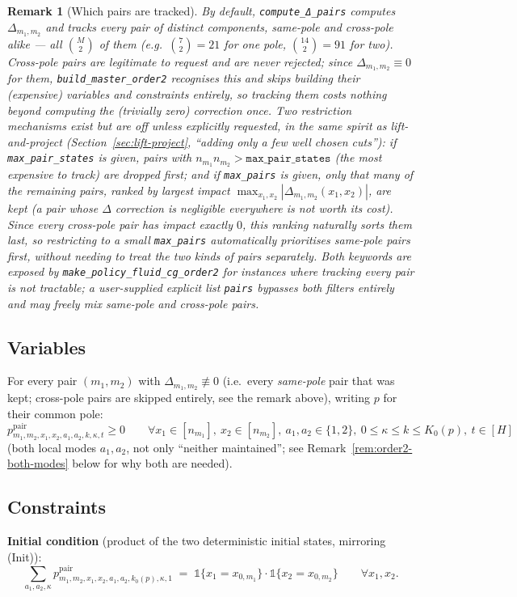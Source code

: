 \documentclass[11pt]{article}
\newtheorem{remark}{Remark}
\begin{document}
\begin{remark}[Which pairs are tracked]
By default, \texttt{compute\_Δ\_pairs} computes $\Delta_{m_1,m_2}$ and tracks \emph{every}
pair of distinct components, same-pole \emph{and} cross-pole alike --- all
$\binom{M}{2}$ of them (e.g.\ $\binom{7}{2}=21$ for one pole, $\binom{14}{2}=91$ for two).
Cross-pole pairs are legitimate to request and are never rejected; since
$\Delta_{m_1,m_2} \equiv 0$ for them, \texttt{build\_master\_order2} recognises this and
skips building their (expensive) variables and constraints entirely, so tracking them
costs nothing beyond computing the (trivially zero) correction once. Two restriction
mechanisms exist but are \emph{off} unless explicitly requested, in the same spirit as
lift-and-project (Section~\ref{sec:lift-project}, ``adding only a few well chosen cuts''):
if \texttt{max\_pair\_states} is given, pairs with $n_{m_1} n_{m_2} >
\texttt{max\_pair\_states}$ (the most expensive to track) are dropped first; and if
\texttt{max\_pairs} is given, only that many of the remaining pairs, ranked by largest
impact $\max_{x_1,x_2} |\Delta_{m_1,m_2}(x_1,x_2)|$, are kept (a pair whose
$\Delta$ correction is negligible everywhere is not worth its cost). Since every
cross-pole pair has impact exactly $0$, this ranking naturally sorts them last, so
restricting to a small \texttt{max\_pairs} automatically prioritises same-pole pairs
first, without needing to treat the two kinds of pairs separately. Both keywords are
exposed by \texttt{make\_policy\_fluid\_cg\_order2} for instances where tracking every
pair is not tractable; a user-supplied explicit list \texttt{pairs} bypasses both filters
entirely and may freely mix same-pole and cross-pole pairs.
\end{remark}

\subsection*{Variables}
For every pair $(m_1,m_2)$ with $\Delta_{m_1,m_2} \not\equiv 0$ (i.e.\ every \emph{same-pole}
pair that was kept; cross-pole pairs are skipped entirely, see the remark above), writing
$p$ for their common pole:
\[
  p^{\mathrm{pair}}_{m_1,m_2,x_1,x_2,a_1,a_2,k,\kappa,t} \ge 0
  \qquad \forall x_1 \in [n_{m_1}],\ x_2 \in [n_{m_2}],\ a_1,a_2 \in \{1,2\},\
  0 \le \kappa \le k \le K_0(p),\ t \in [H]
\]
(both local modes $a_1, a_2$, not only ``neither maintained''; see
Remark~\ref{rem:order2-both-modes} below for why both are needed).

\subsection*{Constraints}
\textbf{Initial condition} (product of the two deterministic initial states, mirroring
(Init)):
\[
  \sum_{a_1,a_2,\kappa} p^{\mathrm{pair}}_{m_1,m_2,x_1,x_2,a_1,a_2,k_0(p),\kappa,1}
  \;=\; \mathbb 1\{x_1=x_{0,m_1}\} \cdot \mathbb 1\{x_2=x_{0,m_2}\}
  \qquad \forall x_1, x_2.
\]
\end{document}
